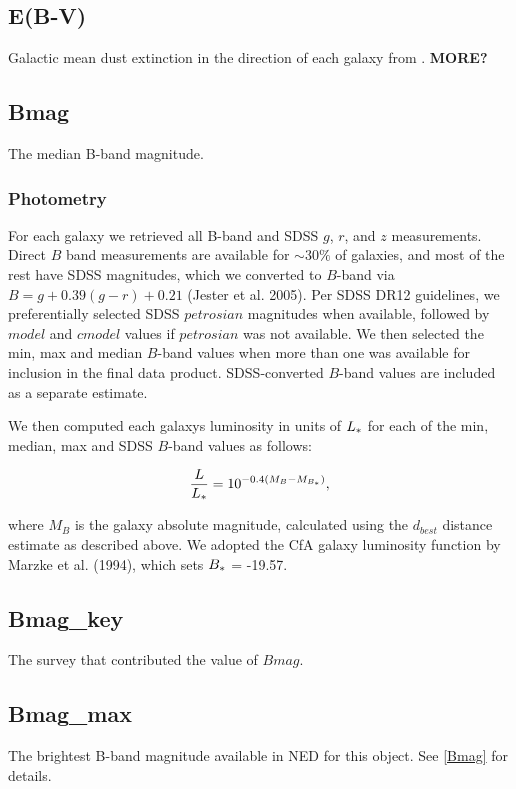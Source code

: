 \documentclass[iop]{emulateapj-rtx4}
\begin{document}
\subsection{E(B-V)}
Galactic mean dust extinction in the direction of each galaxy from \cite{schlafly2011}. \textbf{MORE?}


\subsection{Bmag}
The median B-band magnitude.

\subsubsection{Photometry}
For each galaxy we retrieved all B-band and SDSS $g$, $r$, and $z$ measurements. Direct $B$ band measurements are available for $\sim 30\%$ of galaxies, and most of the rest have SDSS magnitudes, which we converted to $B$-band via $B = g + 0.39 (g-r) + 0.21$ (Jester et al. 2005). Per SDSS DR12 guidelines, we preferentially selected SDSS $petrosian$ magnitudes when available, followed by $model$ and $cmodel$ values if $petrosian$ was not available. We then selected the min, max and median $B$-band values when more than one was available for inclusion in the final data product. SDSS-converted $B$-band values are included as a separate estimate. 

We then computed each galaxys luminosity in units of $L_{\**}$ for each of the min, median, max and SDSS $B$-band values as follows:

\begin{equation}
	\frac{L}{L_{\**}} = 10^{-0.4 (M_{B} - M_{B_{\**}})},
	\label{lstar}
\end{equation}

where $M_B$ is the galaxy absolute magnitude, calculated using the $d_{best}$ distance estimate as described above. We adopted the CfA galaxy luminosity function by Marzke et al. (1994), which sets $B_{\**} $ = -19.57. 


\subsection{Bmag\_key}
The survey that contributed the value of $Bmag$.

\subsection{Bmag\_max}
The brightest B-band magnitude available in NED for this object. See \ref{Bmag} for details.
\end{document}
